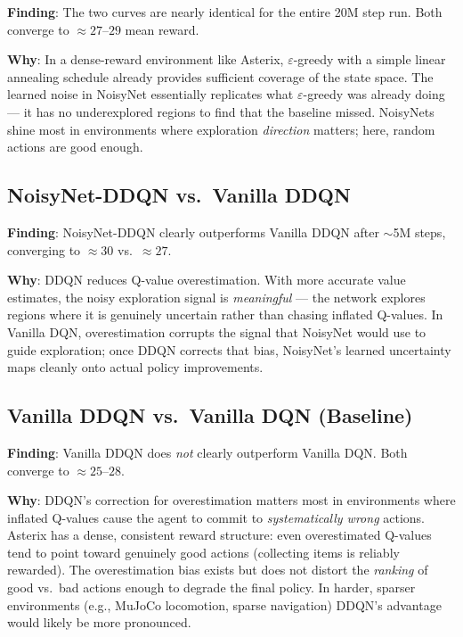 \documentclass[12pt]{article}
\begin{document}
\textbf{Finding}: The two curves are nearly identical for the entire 20M step run.
Both converge to $\approx 27$--$29$ mean reward.

\textbf{Why}: In a dense-reward environment like Asterix, $\varepsilon$-greedy with a
simple linear annealing schedule already provides sufficient coverage of the state space.
The learned noise in NoisyNet essentially replicates what $\varepsilon$-greedy was already
doing --- it has no underexplored regions to find that the baseline missed.
NoisyNets shine most in environments where exploration \emph{direction} matters;
here, random actions are good enough.

\subsection{NoisyNet-DDQN vs.\ Vanilla DDQN}

\textbf{Finding}: NoisyNet-DDQN clearly outperforms Vanilla DDQN after $\sim$5M steps,
converging to $\approx 30$ vs.\ $\approx 27$.

\textbf{Why}: DDQN reduces Q-value overestimation. With more accurate value estimates,
the noisy exploration signal is \emph{meaningful} --- the network explores regions where
it is genuinely uncertain rather than chasing inflated Q-values.
In Vanilla DQN, overestimation corrupts the signal that NoisyNet would use to guide
exploration; once DDQN corrects that bias, NoisyNet's learned uncertainty maps cleanly
onto actual policy improvements.

\subsection{Vanilla DDQN vs.\ Vanilla DQN (Baseline)}

\textbf{Finding}: Vanilla DDQN does \emph{not} clearly outperform Vanilla DQN.
Both converge to $\approx 25$--$28$.

\textbf{Why}: DDQN's correction for overestimation matters most in environments where
inflated Q-values cause the agent to commit to \emph{systematically wrong} actions.
Asterix has a dense, consistent reward structure: even overestimated Q-values tend to point
toward genuinely good actions (collecting items is reliably rewarded).
The overestimation bias exists but does not distort the \emph{ranking} of good vs.\ bad
actions enough to degrade the final policy.
In harder, sparser environments (e.g., MuJoCo locomotion, sparse navigation) DDQN's
advantage would likely be more pronounced.
\end{document}
